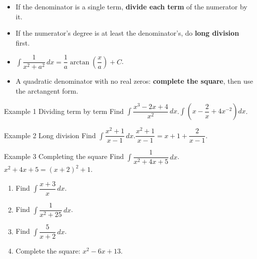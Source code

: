 \documentclass[11pt]{article}
\begin{document}

\begin{ideabox}
\begin{itemize}[leftmargin=*,itemsep=2pt,topsep=2pt]
  \item If the denominator is a single term, \textbf{divide each term} of the numerator by it.
  \item If the numerator's degree is at least the denominator's, do \textbf{long division} first.
  \item $\displaystyle\int\dfrac{1}{x^2+a^2}\,dx=\dfrac1a\arctan\!\left(\dfrac xa\right)+C$.
  \item A quadratic denominator with no real zeros: \textbf{complete the square}, then use the arctangent form.
\end{itemize}
\end{ideabox}

\begin{example}{Example 1 \textperiodcentered{} Dividing term by term}
Find $\displaystyle\int\dfrac{x^3-2x+4}{x^2}\,dx$.\soln $\displaystyle\int\left(x-\dfrac2x+4x^{-2}\right)dx$.
\end{example}

\begin{example}{Example 2 \textperiodcentered{} Long division}
Find $\displaystyle\int\dfrac{x^2+1}{x-1}\,dx$.\soln $\dfrac{x^2+1}{x-1}=x+1+\dfrac{2}{x-1}$.
\end{example}

\begin{example}{Example 3 \textperiodcentered{} Completing the square}
Find $\displaystyle\int\dfrac{1}{x^2+4x+5}\,dx$.\soln $x^2+4x+5=(x+2)^2+1$.
\end{example}

\newpage
{}

\begin{enumerate}[leftmargin=*,itemsep=2pt]
  \item Find $\displaystyle\int\dfrac{x+3}{x}\,dx$.\work{2.3cm}
  \item Find $\displaystyle\int\dfrac{1}{x^2+25}\,dx$.\work{2.3cm}
  \item Find $\displaystyle\int\dfrac{5}{x+2}\,dx$.\work{2.3cm}
  \item Complete the square: $x^2-6x+13$.\work{2.3cm}
\end{enumerate}
\end{document}
